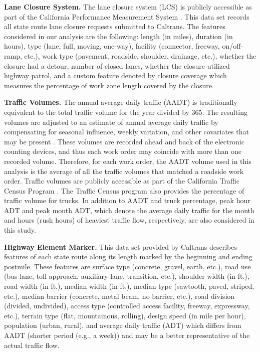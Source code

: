 \documentclass[10pt,a4paper]{article}
\begin{document}
\noindent\textbf{Lane Closure System.} The lane closure system (LCS) is publicly accessible as part of the California Performance Measurement System \citep{pems2019}. This data set records all state route lane closure requests submitted to Caltrans. The features considered in our analysis are the following: length (in miles), duration (in hours), type (lane, full, moving, one-way), facility (connector, freeway, on/off-ramp, etc.), work type (pavement, roadside, shoulder, drainage, etc.), whether the closure had a detour, number of closed lanes, whether the closure utilized highway patrol, and a custom feature denoted by closure coverage which measures the percentage of work zone length covered by the closure.

\noindent\textbf{Traffic Volumes.} The annual average daily traffic (AADT) is traditionally equivalent to the total traffic volume for the year divided by 365. The resulting volumes are adjusted to an estimate of annual average daily traffic by compensating for seasonal influence, weekly variation, and other covariates that may be present \citep{aadt2016}. These volumes are recorded ahead and back of the electronic counting devices, and thus each work order may coincide with more than one recorded volume. Therefore, for each work order, the AADT volume used in this analysis is the average of all the traffic volumes that matched a roadside work order. Traffic volumes are publicly accessible as part of the California Traffic Census Program \citep{aadt2019}. The Traffic Census program also provides the percentage of traffic volume for trucks. In addition to AADT and truck percentage, peak hour ADT and peak month ADT, which denote the average daily traffic for the month and hours (rush hours) of heaviest traffic flow, respectively, are also considered in this study.  

\noindent\textbf{Highway Element Marker.} This data set provided by Caltrans describes features of each state route along its length marked by the beginning and ending postmile. These features are surface type (concrete, gravel, earth, etc.), road use (bus lane, toll approach, auxiliary lane, transition, etc.), shoulder width (in ft.), road width (in ft.), median width (in ft.), median type (sawtooth, paved, striped, etc.), median barrier (concrete, metal beam, no barrier, etc.), road division (divided, undivided), access type (controlled access facility, freeway, expressway, etc.), terrain type (flat, mountainous, rolling), design speed (in mile per hour), population (urban, rural), and average daily traffic (ADT) which differs from AADT (shorter period (e.g., a week)) and may be a better representative of the actual traffic flow.
\end{document}
